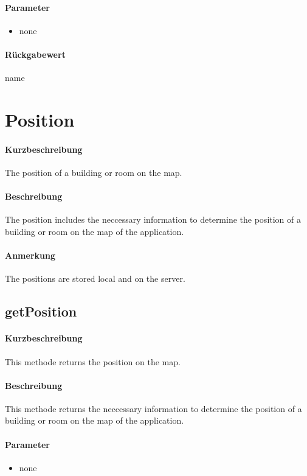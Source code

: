 \paragraph*{Parameter}
\begin{itemize}
    \item none
\end{itemize}
\paragraph*{Rückgabewert}
name


\section{Position}
\paragraph*{Kurzbeschreibung}
The position of a building or room on the map.
\paragraph*{Beschreibung}
The position includes the neccessary information to determine the position of a building or room on the map of the application.
\paragraph*{Anmerkung}
The positions are stored local and on the server.

\subsection{getPosition}%
\paragraph*{Kurzbeschreibung}
This methode returns the position on the map.
\paragraph*{Beschreibung}
This methode returns the neccessary information to determine the position of a building or room on the map of the application.
\paragraph*{Parameter}
\begin{itemize}
    \item none
\end{itemize}
